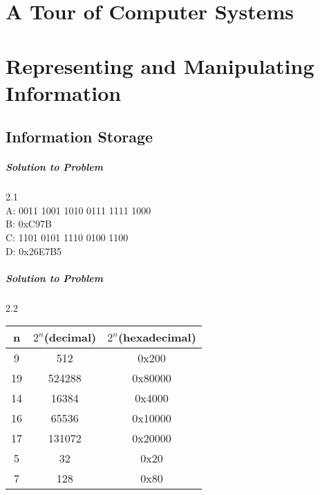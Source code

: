 \documentclass{report}
\begin{document}
\chapter{A Tour of Computer Systems}

\chapter{Representing and Manipulating Information}

\section{Information Storage}
\paragraph{Solution to Problem } 2.1 \\
A: 0011 1001 1010 0111 1111 1000 \\
B: 0xC97B  \\
C: 1101 0101 1110 0100 1100  \\
D: 0x26E7B5  \\

\paragraph{Solution to  Problem } 2.2
\begin{center}
\begin{tabular}{ |c|c|c| } 
\hline
n & \(2^n\)(decimal) & \(2^n\)(hexadecimal) \\
\hline\hline
9 & 512 & 0x200 \\
\hline
19 & 524288 & 0x80000 \\
\hline
14 & 16384 & 0x4000 \\
\hline
16 & 65536 & 0x10000 \\
\hline
17 & 131072 & 0x20000 \\
\hline
5 & 32 & 0x20  \\
\hline
7 & 128 & 0x80 \\
\hline 
\end{tabular}
\end{center}
\end{document}
